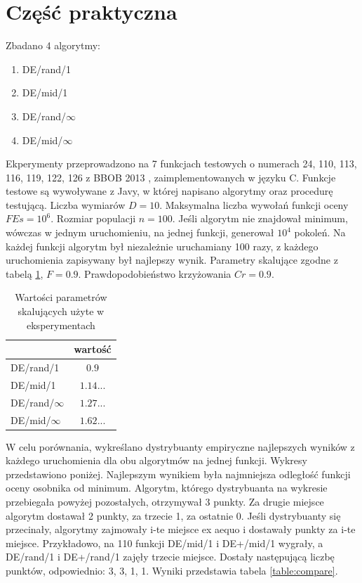 \documentclass[12pt, a4paper]{article}
\begin{document}
\section{Część praktyczna}

Zbadano 4 algorytmy:
\begin{enumerate}
\item DE/rand/1
\item DE/mid/1 
\item DE/rand/$\infty$ 
\item DE/mid/$\infty$ 
\end{enumerate}

Ekperymenty przeprowadzono na 7 funkcjach testowych o numerach 24, 110, 113, 116, 119, 122, 126 z BBOB 2013 \cite{hansen}, zaimplementowanych w języku C.
Funkcje testowe są wywoływane z Javy, w której napisano algorytmy oraz procedurę testującą.
Liczba wymiarów $D = 10$. Maksymalna liczba wywołań funkcji oceny $FEs = 10^6$. Rozmiar populacji $n = 100$. 
Jeśli algorytm nie znajdował minimum, wówczas w jednym uruchomieniu, na jednej funkcji, generował $10^4$ pokoleń.
Na każdej funkcji algorytm był niezależnie uruchamiany 100 razy, z każdego uruchomienia zapisywany był najlepszy wynik.
Parametry skalujące zgodne z tabelą \ref{table:parametry_liczbowe}, $F = 0.9$. Prawdopodobieństwo krzyżowania $Cr = 0.9$. \\

\begin{table}[H]
\centering
\begin{tabular}{ l | c }
                 & wartość \\ \hline
DE/rand/1        & $0.9$ \\ 
DE/mid/1         & $1.14...$ \\
DE/rand/$\infty$ & $1.27...$ \\ 
DE/mid/$\infty$  & $1.62...$\\
\end{tabular}
\caption{Wartości parametrów skalujących użyte w eksperymentach}
\label{table:parametry_liczbowe}
\end{table}

W celu porównania, wykreślano dystrybuanty empiryczne najlepszych wyników z każdego uruchomienia 
dla obu algorytmów na jednej funkcji. Wykresy przedstawiono poniżej.
Najlepszym wynikiem była najmniejsza odległość funkcji oceny osobnika od minimum.
Algorytm, którego dystrybuanta na wykresie przebiegała powyżej pozostałych, otrzymywał 3 punkty. 
Za drugie miejsce algorytm dostawał 2 punkty, za trzecie 1, za ostatnie 0. 
Jeśli dystrybuanty się przecinały, algorytmy zajmowały i-te miejsce ex aequo i dostawały punkty za i-te miejsce.
Przykładowo, na 110 funkcji DE/mid/1 i DE+/mid/1 wygrały, a DE/rand/1 i DE+/rand/1 zajęły trzecie miejsce.
Dostały następującą liczbę punktów, odpowiednio: 3, 3, 1, 1.
Wyniki przedstawia tabela \ref{table:compare}. \\ 
\end{document}
